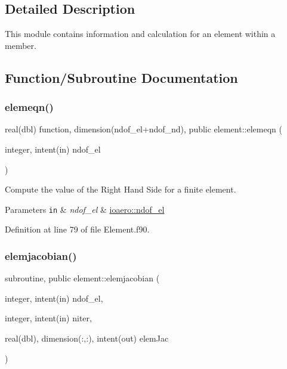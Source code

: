 \subsection{Detailed Description}
This module contains information and calculation for an element within a member. 

\subsection{Function/\+Subroutine Documentation}
\mbox{\label{namespaceelement_a267c29ec99208b5121ba2c6af7180016}} 
\subsubsection{\texorpdfstring{elemeqn()}{elemeqn()}}
{\footnotesize\ttfamily real(dbl) function, dimension(ndof\+\_\+el+ndof\+\_\+nd), public element\+::elemeqn (\begin{DoxyParamCaption}\item[{integer, intent(in)}]{ndof\+\_\+el }\end{DoxyParamCaption})}



Compute the value of the Right Hand Side for a finite element. 


\begin{DoxyParams}[1]{Parameters}
\mbox{\tt in}  & {\em ndof\+\_\+el} & \hyperlink{namespaceioaero_a2b095b5cb5aab1f100d202c8004c9cb5}{ioaero\+::ndof\+\_\+el} \\
\hline
\end{DoxyParams}


Definition at line 79 of file Element.\+f90.

\mbox{\label{namespaceelement_a172c175acb51f133e8b15a64c6e7f238}} 
\subsubsection{\texorpdfstring{elemjacobian()}{elemjacobian()}}
{\footnotesize\ttfamily subroutine, public element\+::elemjacobian (\begin{DoxyParamCaption}\item[{integer, intent(in)}]{ndof\+\_\+el,  }\item[{integer, intent(in)}]{niter,  }\item[{real(dbl), dimension(\+:,\+:), intent(out)}]{elem\+Jac }\end{DoxyParamCaption})}



